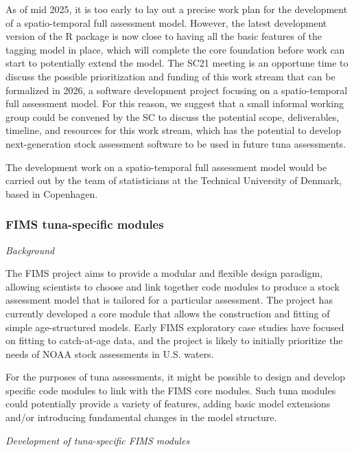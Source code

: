 \documentclass{SCreport}
\begin{document}
As of mid 2025, it is too early to lay out a precise work plan for the
development of a spatio-temporal full assessment model. However, the latest
development version of the R package is now close to having all the basic
features of the tagging model in place, which will complete the core foundation
before work can start to potentially extend the model. The SC21 meeting is an
opportune time to discuss the possible prioritization and funding of this work
stream that can be formalized in 2026, a software development project focusing
on a spatio-temporal full assessment model. For this reason, we suggest that a
small informal working group could be convened by the SC to discuss the
potential scope, deliverables, timeline, and resources for this work stream,
which has the potential to develop next-generation stock assessment software to
be used in future tuna assessments.

The development work on a spatio-temporal full assessment model would be carried
out by the team of statisticians at the Technical University of Denmark, based
in Copenhagen.

\vspace{1ex}

\subsubsection{FIMS tuna-specific modules}
\label{sec:fims-development-project}

\textit{Background}

The FIMS project aims to provide a modular and flexible design paradigm,
allowing scientists to choose and link together code modules to produce a stock
assessment model that is tailored for a particular assessment. The project has
currently developed a core module that allows the construction and fitting of
simple age-structured models. Early FIMS exploratory case studies have focused
on fitting to catch-at-age data, and the project is likely to initially
prioritize the needs of NOAA stock assessments in U.S. waters.

For the purposes of tuna assessments, it might be possible to design and develop
specific code modules to link with the FIMS core modules. Such tuna modules
could potentially provide a variety of features, adding basic model extensions
and/or introducing fundamental changes in the model structure.

\vspace{2ex}

\textit{Development of tuna-specific FIMS modules}
\end{document}
